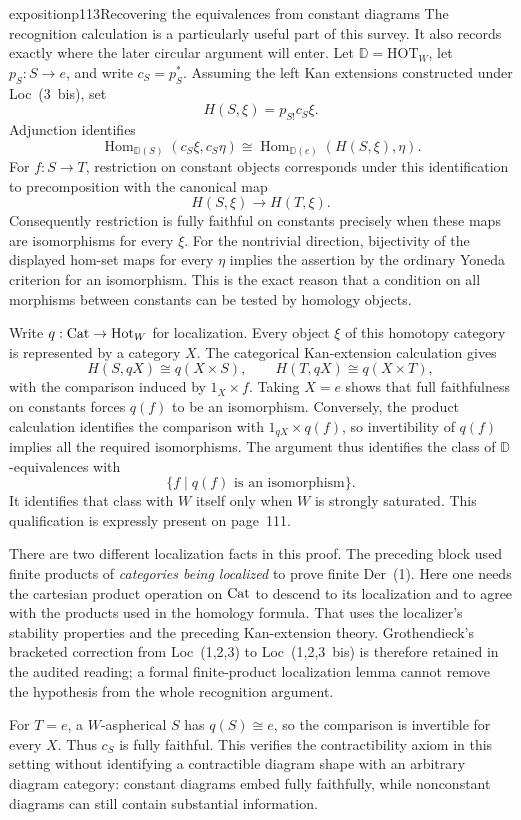 \begin{dcomment}{exposition}{p113}{Recovering the equivalences from constant diagrams}
The recognition calculation is a particularly useful part of this survey. It also records exactly where the later circular argument will enter. Let $\mathbb D=\mathrm{HOT}_W$, let $p_S:S\to e$, and write $c_S=p_S^*$. Assuming the left Kan extensions constructed under Loc~(3~bis), set
\[
 H(S,\xi)=p_{S!}c_S\xi.
\]
Adjunction identifies
\[
 \operatorname{Hom}_{\mathbb D(S)}(c_S\xi,c_S\eta)
 \cong
 \operatorname{Hom}_{\mathbb D(e)}(H(S,\xi),\eta).
\]
For $f:S\to T$, restriction on constant objects corresponds under this identification to precomposition with the canonical map
\[
 H(S,\xi)\longrightarrow H(T,\xi).
\]
Consequently restriction is fully faithful on constants precisely when these maps are isomorphisms for every $\xi$. For the nontrivial direction, bijectivity of the displayed hom-set maps for every $\eta$ implies the assertion by the ordinary Yoneda criterion for an isomorphism. This is the exact reason that a condition on all morphisms between constants can be tested by homology objects.

Write $q:\mathrm{Cat}\to\mathrm{Hot}_W$ for localization. Every object $\xi$ of this homotopy category is represented by a category $X$. The categorical Kan-extension calculation gives
\[
 H(S,qX)\cong q(X\times S),\qquad
 H(T,qX)\cong q(X\times T),
\]
with the comparison induced by $1_X\times f$. Taking $X=e$ shows that full faithfulness on constants forces $q(f)$ to be an isomorphism. Conversely, the product calculation identifies the comparison with $1_{qX}\times q(f)$, so invertibility of $q(f)$ implies all the required isomorphisms. The argument thus identifies the class of $\mathbb D$-equivalences with
\[
 \{f\mid q(f)\text{ is an isomorphism}\}.
\]
It identifies that class with $W$ itself only when $W$ is strongly saturated. This qualification is expressly present on page~111.

There are two different localization facts in this proof. The preceding block used finite products of \emph{categories being localized} to prove finite Der~(1). Here one needs the cartesian product operation on $\mathrm{Cat}$ to descend to its localization and to agree with the products used in the homology formula. That uses the localizer's stability properties and the preceding Kan-extension theory. Grothendieck's bracketed correction from Loc~(1,2,3) to Loc~(1,2,3~bis) is therefore retained in the audited reading; a formal finite-product localization lemma cannot remove the hypothesis from the whole recognition argument.

For $T=e$, a $W$-aspherical $S$ has $q(S)\cong e$, so the comparison is invertible for every $X$. Thus $c_S$ is fully faithful. This verifies the contractibility axiom in this setting without identifying a contractible diagram shape with an arbitrary diagram category: constant diagrams embed fully faithfully, while nonconstant diagrams can still contain substantial information.
\end{dcomment}


